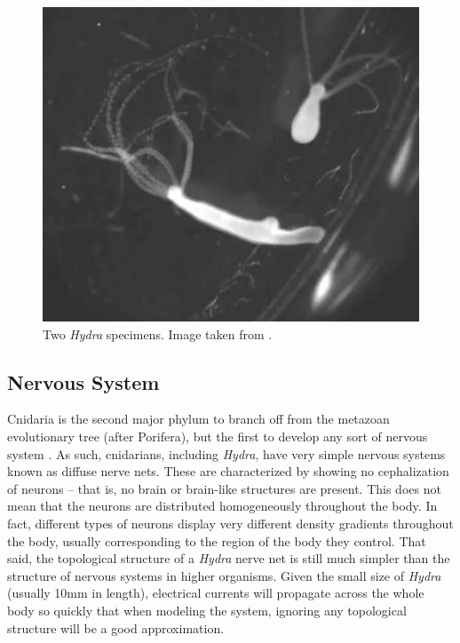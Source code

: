 \documentclass{article}
\begin{document}
\begin{figure}[!htb]
    \centering
    \includegraphics[scale=0.35]{final_paper/hydra.jpg}
    \caption{Two \textit{Hydra} specimens. Image taken from \cite{behavior}.}
    \label{fig:hydra}
\end{figure}

\subsection{Nervous System}
Cnidaria is the second major phylum to branch off from the metazoan evolutionary tree (after Porifera), but the first to develop any sort of nervous system \cite{first}. As such, cnidarians, including \textit{Hydra}, have very simple nervous systems known as diffuse nerve nets. These are characterized by showing no cephalization of neurons -- that is, no brain or brain-like structures are present. This does not mean that the neurons are distributed homogeneously throughout the body. In fact, different types of neurons display very different density gradients throughout the body, usually corresponding to the region of the body they control. That said, the topological structure of a \textit{Hydra} nerve net is still much simpler than the structure of nervous systems in higher organisms. Given the small size of \textit{Hydra} (usually 10mm in length), electrical currents will propagate across the whole body so quickly that when modeling the system, ignoring any topological structure will be a good approximation.
\end{document}
